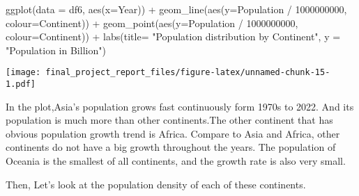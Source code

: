 \documentclass[
]{article}
\newenvironment{Shaded}{\begin{snugshade}}{\end{snugshade}}
\newcommand{\AttributeTok}[1]{\textcolor[rgb]{0.77,0.63,0.00}{#1}}
\newcommand{\DecValTok}[1]{\textcolor[rgb]{0.00,0.00,0.81}{#1}}
\newcommand{\FunctionTok}[1]{\textcolor[rgb]{0.00,0.00,0.00}{#1}}
\newcommand{\NormalTok}[1]{#1}
\newcommand{\SpecialCharTok}[1]{\textcolor[rgb]{0.00,0.00,0.00}{#1}}
\newcommand{\StringTok}[1]{\textcolor[rgb]{0.31,0.60,0.02}{#1}}
\begin{document}
\begin{Shaded}
\begin{Highlighting}[]
\FunctionTok{ggplot}\NormalTok{(}\AttributeTok{data =}\NormalTok{ df6, }\FunctionTok{aes}\NormalTok{(}\AttributeTok{x=}\NormalTok{Year)) }\SpecialCharTok{+} 
  \FunctionTok{geom\_line}\NormalTok{(}\FunctionTok{aes}\NormalTok{(}\AttributeTok{y=}\NormalTok{Population }\SpecialCharTok{/} \DecValTok{1000000000}\NormalTok{, }\AttributeTok{colour=}\NormalTok{Continent)) }\SpecialCharTok{+} 
  \FunctionTok{geom\_point}\NormalTok{(}\FunctionTok{aes}\NormalTok{(}\AttributeTok{y=}\NormalTok{Population }\SpecialCharTok{/} \DecValTok{1000000000}\NormalTok{, }\AttributeTok{colour=}\NormalTok{Continent)) }\SpecialCharTok{+}
  \FunctionTok{labs}\NormalTok{(}\AttributeTok{title=} \StringTok{"Population distribution by Continent"}\NormalTok{, }\AttributeTok{y =} \StringTok{"Population in Billion"}\NormalTok{)}
\end{Highlighting}
\end{Shaded}

\texttt{[image: final\_project\_report\_files/figure-latex/unnamed-chunk-15-1.pdf]}

In the plot,Asia's population grows fast continuously form 1970s to
2022. And its population is much more than other continents.The other
continent that has obvious population growth trend is Africa. Compare to
Asia and Africa, other continents do not have a big growth throughout
the years. The population of Oceania is the smallest of all continents,
and the growth rate is also very small.

Then, Let's look at the population density of each of these continents.
\end{document}
